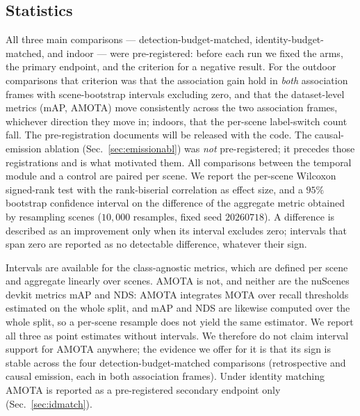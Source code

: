 \subsection{Statistics}
\label{sec:stats}
All three main comparisons --- detection-budget-matched,
identity-budget-matched, and indoor --- were pre-registered: before each run
we fixed the arms, the primary endpoint, and the criterion for a negative
result. For the outdoor comparisons that criterion was that the association
gain hold in \emph{both} association frames with scene-bootstrap intervals
excluding zero, and that the dataset-level metrics (mAP, AMOTA) move
consistently across the two association frames, whichever direction they move
in; indoors,
that the per-scene label-switch count fall. The pre-registration documents
will be released with the code. The causal-emission ablation
(Sec.~\ref{sec:emissionabl}) was \emph{not} pre-registered; it precedes those
registrations and is what motivated them. All comparisons between the
temporal module and a control are paired per scene. We report the per-scene Wilcoxon signed-rank test with the
rank-biserial correlation as effect size, and a $95\%$ bootstrap confidence
interval on the difference of the aggregate metric obtained by resampling
scenes ($10{,}000$ resamples, fixed seed $20260718$). A difference is described as an
improvement only when its interval excludes zero; intervals that span zero are
reported as no detectable difference, whatever their sign.

Intervals are available for the class-agnostic metrics, which are defined
per scene and aggregate linearly over scenes. AMOTA is not, and neither are
the nuScenes devkit metrics mAP and NDS: AMOTA integrates MOTA over recall
thresholds estimated on the whole split, and mAP and NDS are likewise computed
over the whole split, so a per-scene resample does not yield the same
estimator. We report all three as point estimates without intervals. We therefore do not claim interval support for
AMOTA anywhere; the evidence we offer for it is that its sign is stable across
the four detection-budget-matched comparisons (retrospective and causal
emission, each in both association frames). Under identity matching AMOTA is
reported as a pre-registered secondary endpoint only (Sec.~\ref{sec:idmatch}).
